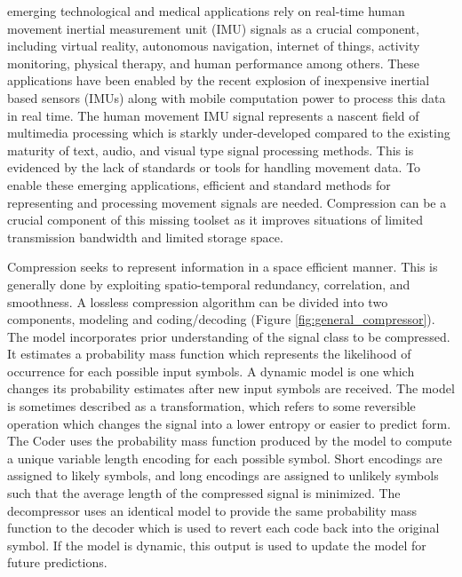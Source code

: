 \documentclass[journal]{IEEEtran}
\begin{document}
 emerging technological and medical applications rely on real-time human movement inertial measurement unit (IMU) signals as a crucial component, including virtual reality\cite{Ahmad2013}, autonomous navigation\cite{Campbell2018}, internet of things\cite{Fernandez-Carames2018}, activity monitoring\cite{Yang2010}\cite{Filippeschi2017}, physical therapy\cite{Patel2012}\cite{Shull2014}, and human performance\cite{Camomilla2018}\cite{GobinathAroganam2019} among others. These applications have been enabled by the recent explosion of inexpensive inertial based sensors (IMUs) along with mobile computation power to process this data in real time. The human movement IMU signal represents a nascent field of multimedia processing which is starkly under-developed compared to the existing maturity of text, audio, and visual type signal processing methods. This is evidenced by the lack of standards or tools for handling movement data. To enable these emerging applications, efficient and standard methods for representing and processing movement signals are needed. Compression can be a crucial component of this missing toolset as it improves situations of limited transmission bandwidth and limited storage space.

Compression seeks to represent information in a space efficient manner. This is generally done by exploiting spatio-temporal redundancy, correlation, and smoothness\cite{Sayood2006}. A lossless compression algorithm can be divided into two components, modeling and coding/decoding (Figure \ref{fig:general_compressor})\cite{Nelson1996}. The model incorporates prior understanding of the signal class to be compressed. It estimates a probability mass function which represents the likelihood of occurrence for each possible input symbols. A dynamic model is one which changes its probability estimates after new input symbols are received. The model is sometimes described as a transformation, which refers to some reversible operation which changes the signal into a lower entropy or easier to predict form.  The Coder uses the probability mass function produced by the model to compute a unique variable length encoding for each possible symbol. Short encodings are assigned to likely symbols, and long encodings are assigned to unlikely symbols such that the average length of the compressed signal is minimized. The decompressor uses an identical model to provide the same probability mass function to the decoder which is used to revert each code back into the original symbol. If the model is dynamic, this output is used to update the model for future predictions.
\end{document}
